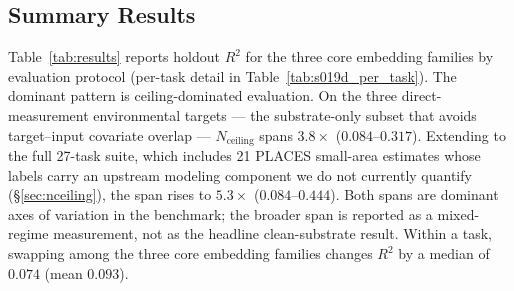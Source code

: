 \documentclass{article}
\begin{document}
\subsection{Summary Results}

Table~\ref{tab:results} reports holdout $R^2$ for the three core embedding families by evaluation protocol (per-task detail in Table~\ref{tab:s019d_per_task}). The dominant pattern is ceiling-dominated evaluation. On the three direct-measurement environmental targets --- the substrate-only subset that avoids target--input covariate overlap --- $N_{\text{ceiling}}$ spans $3.8{\times}$ ($0.084$--$0.317$). Extending to the full 27-task suite, which includes 21 PLACES small-area estimates whose labels carry an upstream modeling component we do not currently quantify (\S\ref{sec:nceiling}), the span rises to $5.3{\times}$ ($0.084$--$0.444$). Both spans are dominant axes of variation in the benchmark; the broader span is reported as a mixed-regime measurement, not as the headline clean-substrate result. Within a task, swapping among the three core embedding families changes $R^2$ by a median of $0.074$ (mean $0.093$).
\end{document}
